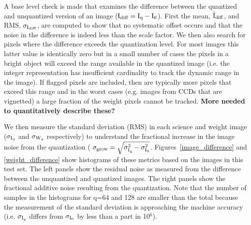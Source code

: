 A base level check is made that examines the difference between the quantized and unquantized version
of an image (${\rm I}_{\rm diff} = {\rm I}_{\rm q}-{\rm I}_{\rm 0}$).  First the mean, 
$\bar{\rm I}_{\rm diff}$, and RMS, $\sigma_{{\rm I}_{\rm diff}}$, are computed to show that no
systematic offset occurs and that the noise in the difference is indeed less than the scale factor.
We then also search for pixels where the difference exceeds the quantization level.  For most images
this latter value is identically zero but in a small number of cases the pixels in a bright object
will exceed the range available in the quantized image (i.e. the integer representation has insufficient
cardinality to track the dynamic range in the image).  If flagged pixels are included, then are typically
more pixels that exceed this range and in the worst cases (e.g. images from CCDs that are vignetted) a
large fraction of the weight pixels cannot be tracked.
{\bf More needed to quantitatively describe these?}

We then measure the standard deviation (RMS) in each science and weight image ($\sigma_{{\rm I}_{\rm q}}$ 
and $\sigma_{{\rm W}_{q}}$ respectively) to understand the fractional increase in the image noise
from the quantization ( $\sigma_{\rm grow} = \sqrt{\sigma_{{\rm I}_{q}}^2 - \sigma_{{\rm I}_{0}}^2 }$.  
Figures~\ref{image_difference} and \ref{weight_difference} show histograms of these metrics based
on the images in this test set.  The left panels show the residual noise as measured from the difference
between the unquantized and quantized images.  The right panels show the fractional additive noise 
resulting from the quantization.  Note that the number of samples in the histograms for q=64 and 128 
are smaller than the total because the measurement of the standard deviation is approaching the machine 
accuracy (i.e.  $\sigma_{{\rm I}_{q}}$ differs from $\sigma_{{\rm I}_{0}}$ by less than a part in 10$^{6}$).

